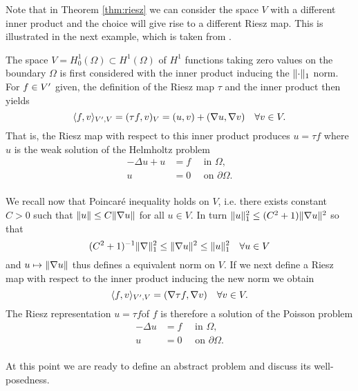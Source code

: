 Note that in Theorem \ref{thm:riesz} we can consider the space $V$ with a different 
inner product and the choice will give rise to a different Riesz map. This is
illustrated in the next example, which is taken from . 

\begin{example}\label{ex:riesz}
  The space $V=H^1_0(\Omega)\subset H^1(\Omega)$ of $H^1$ functions taking zero values 
  on the boundary $\Omega$ is first considered with the inner product inducing the
  $\lVert\cdot\rVert_1$ norm. For $f\in V^{\prime}$ given, the definition of
  the Riesz map $\tau$ and the inner product then yields
  \[
    \langle f, v\rangle_{V^{\prime}, V} = (\tau f, v)_V = (u, v) + (\nabla u, \nabla v)
    \quad \forall v\in V.
  \]
  That is, the Riesz map with respect to this inner product produces $u=\tau f$
  where $u$ is the weak solution of the Helmholtz problem
  \[
    \begin{aligned}
      -\Delta u + u &= f\quad\mbox{ in }\Omega,\\
                  u &= 0\quad\mbox{ on }\partial\Omega.\\
    \end{aligned}
  \]

  We recall now that Poincar{\'e} inequality holds on $V$, i.e. there exists
  constant $C>0$ such that $\lVert u\rVert \leq C \lVert\nabla u\rVert$ for all $u\in V$. In
  turn $\lVert u\rVert^2_1\leq(C^2+1)\lVert\nabla u\rVert^2$ so that
  \[
    (C^2+1)^{-1}\lVert\nabla\rVert^2_1 \leq \lVert\nabla u\rVert^2 \leq
    \lVert u\rVert^2_1\quad\forall u \in V
  \]
  and $u\mapsto \lVert\nabla u\rVert$ thus defines a equivalent norm on $V$. If we next
  define a Riesz map with respect to the inner product inducing the new norm we
  obtain
  \[
    \langle f, v\rangle_{V^{\prime}, V} = (\nabla \tau f, \nabla v) \quad\forall v\in V.
  \]
  The Riesz representation $u=\tau f$of $f$ is therefore a solution of the Poisson 
  problem
  \[
    \begin{aligned}
      -\Delta u &= f\quad\mbox{ in }\Omega,\\
                  u &= 0\quad\mbox{ on }\partial\Omega.\\
    \end{aligned}
  \]
\end{example}
  At this point we are ready to define an abstract problem and discuss its
  well-posedness.

%

